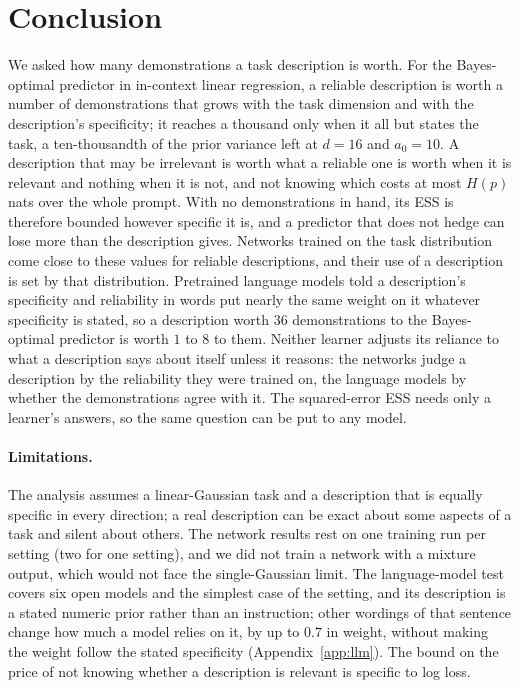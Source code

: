 \documentclass{article}
\begin{document}
\section{Conclusion}
We asked how many demonstrations a task description is worth. For the Bayes-optimal predictor in in-context linear regression, a reliable description is worth a number of demonstrations that grows with the task dimension and with the description's specificity; it reaches a thousand only when it all but states the task, a ten-thousandth of the prior variance left at $d = 16$ and $a_0 = 10$. A description that may be irrelevant is worth what a reliable one is worth when it is relevant and nothing when it is not, and not knowing which costs at most $H(p)$ nats over the whole prompt. With no demonstrations in hand, its ESS is therefore bounded however specific it is, and a predictor that does not hedge can lose more than the description gives. Networks trained on the task distribution come close to these values for reliable descriptions, and their use of a description is set by that distribution. Pretrained language models told a description's specificity and reliability in words put nearly the same weight on it whatever specificity is stated, so a description worth $36$ demonstrations to the Bayes-optimal predictor is worth $1$ to $8$ to them. Neither learner adjusts its reliance to what a description says about itself unless it reasons: the networks judge a description by the reliability they were trained on, the language models by whether the demonstrations agree with it. The squared-error ESS needs only a learner's answers, so the same question can be put to any model.

\paragraph{Limitations.} The analysis assumes a linear-Gaussian task and a description that is equally specific in every direction; a real description can be exact about some aspects of a task and silent about others. The network results rest on one training run per setting (two for one setting), and we did not train a network with a mixture output, which would not face the single-Gaussian limit. The language-model test covers six open models and the simplest case of the setting, and its description is a stated numeric prior rather than an instruction; other wordings of that sentence change how much a model relies on it, by up to $0.7$ in weight, without making the weight follow the stated specificity (Appendix~\ref{app:llm}). The bound on the price of not knowing whether a description is relevant is specific to log loss.
\end{document}
